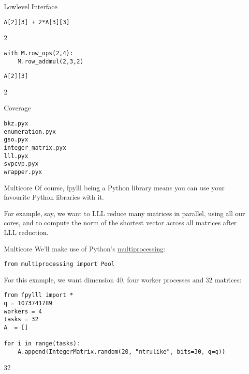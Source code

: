 \documentclass[presentation,smaller]{beamer}
\begin{document}
\begin{frame}[fragile,label={sec:orgheadline8}]{Lowlevel Interface}
 \lstset{language=Python,label= ,caption= ,captionpos=b,numbers=none}
\begin{lstlisting}
A[2][3] + 2*A[3][3]
\end{lstlisting}

2

\lstset{language=Python,label= ,caption= ,captionpos=b,numbers=none}
\begin{lstlisting}
with M.row_ops(2,4):
    M.row_addmul(2,3,2)
\end{lstlisting}

\lstset{language=Python,label= ,caption= ,captionpos=b,numbers=none}
\begin{lstlisting}
A[2][3]
\end{lstlisting}

2
\end{frame}

\begin{frame}[fragile,label={sec:orgheadline9}]{Coverage}
 \begin{verbatim}
bkz.pyx
enumeration.pyx
gso.pyx
integer_matrix.pyx
lll.pyx
svpcvp.pyx
wrapper.pyx
\end{verbatim}
\end{frame}

\begin{frame}[label={sec:orgheadline10}]{Multicore}
Of course, \alert{fpylll} being a Python library means you can use your favourite Python libraries with it. 

For example, say, we want to LLL reduce many matrices in parallel, using all our cores, and to compute the norm of the shortest vector across all matrices after LLL reduction. 
\end{frame}

\begin{frame}[fragile,label={sec:orgheadline11}]{Multicore}
 We’ll make use of Python’s \href{https://docs.python.org/2/library/multiprocessing.html}{multiprocessing}:

\lstset{language=Python,label= ,caption= ,captionpos=b,numbers=none}
\begin{lstlisting}
from multiprocessing import Pool
\end{lstlisting}

For this example, we want dimension 40, four worker processes and 32 matrices:

\lstset{language=Python,label= ,caption= ,captionpos=b,numbers=none}
\begin{lstlisting}
from fpylll import *
q = 1073741789
workers = 4
tasks = 32
A  = []

for i in range(tasks):
    A.append(IntegerMatrix.random(20, "ntrulike", bits=30, q=q))
\end{lstlisting}

32
\end{frame}
\end{document}

